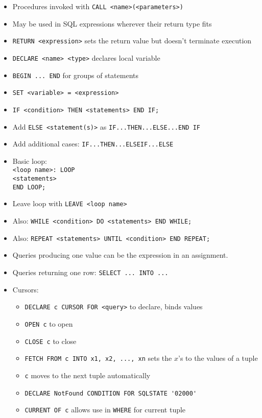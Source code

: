 \documentclass[landscape,8pt]{extarticle}
\newcommand{\code}{\lstinline}
\begin{document}
\begin{multicols}{4}
\begin{itemize}
\begin{itemize}
        \item Procedures invoked with \code{CALL <name>(<parameters>)}
        \item May be used in SQL expressions wherever their return type fits
        \item \code{RETURN <expression>} sets the return value but doesn't terminate execution
        \item \code{DECLARE <name> <type>} declares local variable
        \item \code{BEGIN ... END} for groups of statements
        \item \code{SET <variable> = <expression>}
        \item \code{IF <condition> THEN <statements> END IF;}
        \item Add \code{ELSE <statement(s)>} as \code{IF...THEN...ELSE...END IF}
        \item Add additional cases: \code{IF...THEN...ELSEIF...ELSE}
        \item Basic loop:\\
\code{<loop name>: LOOP}\\
\code{<statements>}\\
\code{END LOOP;}
        \item Leave loop with \code{LEAVE <loop name>}
        \item Also: \code{WHILE <condition> DO <statements> END WHILE;}
        \item Also: \code{REPEAT <statements> UNTIL <condition> END REPEAT;}
        \item Queries producing one value can be the expression in an assignment.
        \item Queries returning one row: \code{SELECT ... INTO ...}
        \item Cursors:
        \begin{itemize}
            \item \code{DECLARE c CURSOR FOR <query>} to declare, binds values
            \item \code{OPEN c} to open
            \item \code{CLOSE c} to close
            \item \code{FETCH FROM c INTO x1, x2, ..., xn} sets the $x$'s to the values of a tuple
            \item \code{c} moves to the next tuple automatically
            \item \code{DECLARE NotFound CONDITION FOR SQLSTATE '02000'}
            \item \code{CURRENT OF c} allows use in \code{WHERE} for current tuple

\end{itemize}
\end{itemize}
\end{itemize}
\end{multicols}
\end{document}

